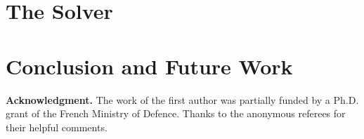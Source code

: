 \documentclass[EPiCempty]{easychair}
\begin{document}
\section{The Solver}
\label{sect:solver}



\section{Conclusion and Future Work}
\label{sect:discussion}


\noindent\textbf{Acknowledgment.} 
The work of the first author was partially funded by a Ph.D. grant of
the French Ministry of Defence. Thanks to the anonymous referees 
for their helpful comments.










\end{document}
